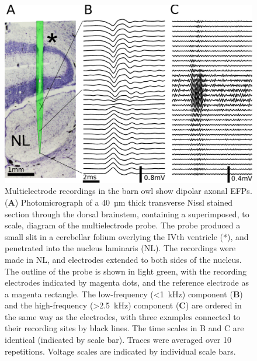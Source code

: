 \documentclass[]{elife}
\begin{document}
\begin{figure}[htbp]
\begin{fullwidth}
\includegraphics[width=0.95\linewidth]{figs/fig_4.pdf}
\caption{\label{fig:expmethod}Multielectrode recordings in the barn owl
show dipolar axonal EFPs. (\textbf{A}) Photomicrograph of a 40~µm thick
transverse Nissl stained section through the dorsal brainstem,
containing a superimposed, to scale, diagram of the multielectrode
probe. The probe produced a small slit in a cerebellar folium overlying
the IVth ventricle (*), and penetrated into the nucleus laminaris (NL).
The recordings were made in NL, and electrodes extended to both sides of
the nucleus. The outline of the probe is shown in light green, with the
recording electrodes indicated by magenta dots, and the reference
electrode as a magenta rectangle. The low-frequency (\textless{}1~kHz)
component (\textbf{B}) and the high-frequency (\textgreater{}2.5~kHz)
component (\textbf{C}) are ordered in the same way as the electrodes,
with three examples connected to their recording sites by black lines.
The time scales in B and C are identical (indicated by scale bar).
Traces were averaged over 10 repetitions. Voltage scales are indicated
by individual scale bars.}
\end{fullwidth}
\end{figure}
\end{document}
